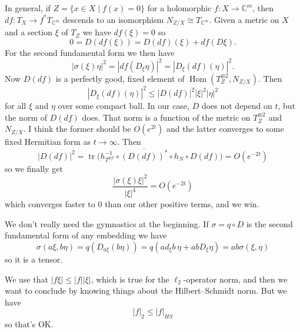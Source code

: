 \documentclass[10pt,a4paper]{amsart}
\newcommand{\kk}[1]{\mathbb{#1}}
\def\ov#1{\overline{#1}}
\DeclareMathOperator{\Hom}{Hom}
\DeclareMathOperator{\tr}{tr}
\begin{document}
In general, if $Z = \{x \in X \mid f(x) = 0\}$ for a holomorphic $f : X \to \kk
C^m$, then $df : T_X \to f^* T_{\kk C^m}$ descends to an isomorphism $N_{Z/X} \cong
T_{\kk C^m}$.
Given a metric on $X$
and a section $\xi$ of $T_Z$ we have $df(\xi) = 0$ so
$$
0 = D(df(\xi))
= D(df)(\xi) + df(D\xi).
$$
For the second fundamental form we then have
$$
|\sigma(\xi)\eta|^2
= |df(D_\xi \eta)|^2
= |D_\xi(df)(\eta)|^2.
$$
Now $D(df)$ is a perfectly good, fixed element of $\Hom(T_Z^{\otimes 2},
N_{Z/X})$.
Then
$$
|D_\xi(df)(\eta)|^2
\leq |D(df)|^2 |\xi|^2 |\eta|^2
$$
for all $\xi$ and $\eta$ over some compact ball.
In our case, $D$ does not depend on $t$, but the norm of $D(df)$ does.
That norm is a function of the metric on $T_Z^{\otimes 2}$ and $N_{Z/X}$.
I think the former should be $O(e^{2t})$ and the latter converges to some fixed
Hermitian form as $t \to \infty$. Then
$$
|D(df)|^2
= \tr\bigl(
h_{T^{\otimes 2}}^{-1} \circ
\ov{(D(df))^*} \circ
h_{N} \circ D(df)
\bigr)
= O(e^{-2t})
$$
so we finally get
$$
\frac{|\sigma(\xi)\xi|^2}{|\xi|^4} = O(e^{-2t})
$$
which converges faster to $0$ than our other positive terms, and we win.

We don't really need the gymnastics at the beginning.
If $\sigma = q \circ D$ is the second fundamental form of any embedding we have
$$
\sigma(a \xi, b \eta)
= q(D_{a\xi}(b \eta))
= q(a d_\xi b \, \eta + ab D_\xi \eta)
= ab \sigma(\xi, \eta)
$$
so it is a tensor.

We use that $|f\xi| \leq |f||\xi|$, which is true for the $\ell_2$-operator norm,
and then we want to conclude by knowing things about the Hilbert--Schmidt norm.
But we have
$$
|f|_2 \leq |f|_{HS}
$$
so that's OK.
\end{document}
